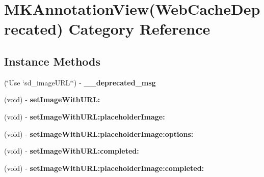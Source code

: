 \hypertarget{category_m_k_annotation_view_07_web_cache_deprecated_08}{}\section{M\+K\+Annotation\+View(Web\+Cache\+Deprecated) Category Reference}
\label{category_m_k_annotation_view_07_web_cache_deprecated_08}
\subsection*{Instance Methods}
\begin{DoxyCompactItemize}
\item 
\hypertarget{category_m_k_annotation_view_07_web_cache_deprecated_08_ac362c7aa8cac342e2dcf6853d2694939}{}(\char`\"{}Use `sd\+\_\+image\+U\+R\+L`\char`\"{}) -\/ {\bfseries \+\_\+\+\_\+deprecated\+\_\+msg}\label{category_m_k_annotation_view_07_web_cache_deprecated_08_ac362c7aa8cac342e2dcf6853d2694939}

\item 
\hypertarget{category_m_k_annotation_view_07_web_cache_deprecated_08_a072711e8659b3ebed0e5a892c4cfc8b0}{}(void) -\/ {\bfseries set\+Image\+With\+U\+R\+L\+:}\label{category_m_k_annotation_view_07_web_cache_deprecated_08_a072711e8659b3ebed0e5a892c4cfc8b0}

\item 
\hypertarget{category_m_k_annotation_view_07_web_cache_deprecated_08_a78f2de7286cb1e8e4f4df4a69a960b39}{}(void) -\/ {\bfseries set\+Image\+With\+U\+R\+L\+:placeholder\+Image\+:}\label{category_m_k_annotation_view_07_web_cache_deprecated_08_a78f2de7286cb1e8e4f4df4a69a960b39}

\item 
\hypertarget{category_m_k_annotation_view_07_web_cache_deprecated_08_ac9ac61ecb3797369c8cb825d02972a6c}{}(void) -\/ {\bfseries set\+Image\+With\+U\+R\+L\+:placeholder\+Image\+:options\+:}\label{category_m_k_annotation_view_07_web_cache_deprecated_08_ac9ac61ecb3797369c8cb825d02972a6c}

\item 
\hypertarget{category_m_k_annotation_view_07_web_cache_deprecated_08_a3d5dcd734694b31558bc42562b59a829}{}(void) -\/ {\bfseries set\+Image\+With\+U\+R\+L\+:completed\+:}\label{category_m_k_annotation_view_07_web_cache_deprecated_08_a3d5dcd734694b31558bc42562b59a829}

\item 
\hypertarget{category_m_k_annotation_view_07_web_cache_deprecated_08_a0960e2e18949d0ba1696a8cc4a6704cf}{}(void) -\/ {\bfseries set\+Image\+With\+U\+R\+L\+:placeholder\+Image\+:completed\+:}\label{category_m_k_annotation_view_07_web_cache_deprecated_08_a0960e2e18949d0ba1696a8cc4a6704cf}


\end{DoxyCompactItemize}
